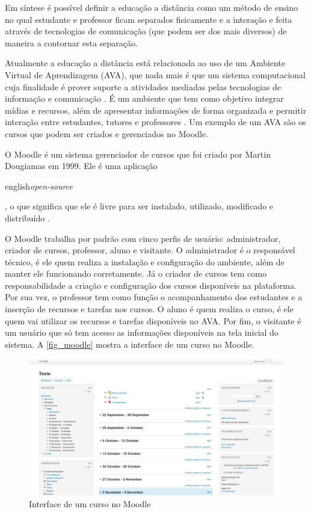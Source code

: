 \documentclass[
	12pt,				%
	openright,			%
	oneside,			%
	a4paper,			%
	english,			%
	french,				%
	spanish,			%
	brazil				%
	]{abntex2}
\begin{document}
Em síntese é possível definir a educação a distância como um método de ensino no qual estudante e professor ficam separados fisicamente e a interação e feita através de tecnologias de comunicação (que podem ser dos mais diversos) de maneira a contornar esta separação.

Atualmente a educação a distância está relacionada ao uso de um Ambiente Virtual de Aprendizagem (AVA), que nada mais é que um sistema computacional cuja finalidade é prover suporte a atividades mediadas pelas tecnologias de informação e comunicação \cite{Almeida2010}. É um ambiente que tem como objetivo integrar mídias e recursos, além de apresentar informações de forma organizada e permitir interação entre estudantes, tutores e professores \cite{Franciscato2008}. Um exemplo de um AVA são os cursos que podem ser criados e gerenciados no Moodle.
   
O Moodle é um sistema gerenciador de cursos que foi criado por Martin Dougiamas em 1999. Ele é uma aplicação \begin{otherlanguage*}{english}\textit{open-source}\end{otherlanguage*}, o que significa que ele é livre para ser instalado, utilizado, modificado e distribuído \cite{Dougiamas2003}. 

O Moodle trabalha por padrão com cinco perfis de usuário: administrador, criador de cursos, professor, aluno e visitante. O administrador é o responsável técnico, é ele quem realiza a instalação e configuração do ambiente, além de manter ele funcionando corretamente. Já o criador de cursos tem como responsabilidade a criação e configuração dos cursos disponíveis na plataforma. Por sua vez, o professor tem como função o acompanhamento dos estudantes e a inserção de recursos e tarefas nos cursos. O aluno é quem realiza o curso, é ele quem vai utilizar os recursos e tarefas disponíveis no AVA. Por fim, o visitante é um usuário que só tem acesso as informações disponíveis na tela inicial do sistema. A \autoref{fig_moodle} mostra a interface de um curso no Moodle.


\begin{figure}[htb]
	\caption{\label{fig_moodle}Interface de um curso no Moodle}
	\begin{center}
		\includegraphics[scale=0.2]{moodle.png}
	\end{center}
\end{figure}
\end{document}
